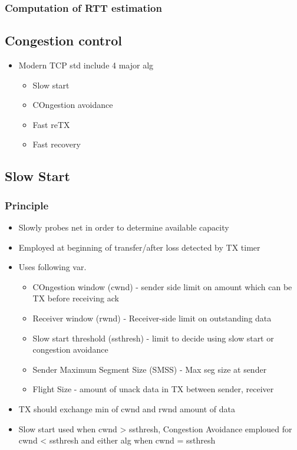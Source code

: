 \documentclass[a4paper]{article}
\begin{document}
\subsubsection{Computation of RTT estimation}
\subsection{Congestion control}
\begin{itemize}
	\item Modern TCP std include 4 major alg
	\begin{itemize}
		\item Slow start
		\item COngestion avoidance
		\item Fast reTX
		\item Fast recovery
	\end{itemize}
\end{itemize}
\subsection{Slow Start}
\subsubsection{Principle}
\begin{itemize}
	\item Slowly probes net in order to determine available capacity
	\item Employed at beginning of transfer/after loss detected by TX timer
	\item Uses following var.
		\begin{itemize}
			\item COngestion window (cwnd) - sender side limit on
				amount which can be TX before receiving ack
			\item Receiver window (rwnd) - Receiver-side limit on
				outstanding data
			\item Slow start threshold (ssthresh) - limit to decide
				using slow start or congestion avoidance
			\item Sender Maximum Segment Size (SMSS) - Max seg size
				at sender
			\item Flight Size - amount of unack data in TX between
				sender, receiver
		\end{itemize}
	\item TX should exchange min of cwnd and rwnd amount of data
	\item Slow start used when cwnd > ssthresh, Congestion Avoidance
		emploued for cwnd < ssthresh and either alg when cwnd = ssthresh
\end{itemize}
\end{document}
